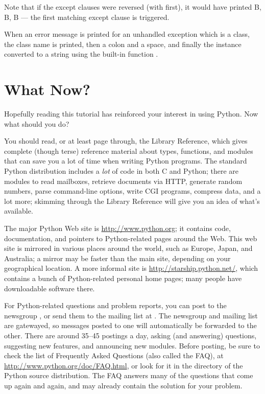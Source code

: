 \documentclass{manual}
\begin{document}
Note that if the except clauses were reversed (with
 first), it would have printed B, B, B --- the first
matching except clause is triggered.

When an error message is printed for an unhandled exception which is a
class, the class name is printed, then a colon and a space, and
finally the instance converted to a string using the built-in function
.


\chapter{What Now? \label{whatNow}}

Hopefully reading this tutorial has reinforced your interest in using
Python.  Now what should you do?

You should read, or at least page through, the Library Reference,
which gives complete (though terse) reference material about types,
functions, and modules that can save you a lot of time when writing
Python programs.  The standard Python distribution includes a
\emph{lot} of code in both C and Python; there are modules to read
\UNIX{} mailboxes, retrieve documents via HTTP, generate random
numbers, parse command-line options, write CGI programs, compress
data, and a lot more; skimming through the Library Reference will give
you an idea of what's available.

The major Python Web site is \url{http://www.python.org}; it contains
code, documentation, and pointers to Python-related pages around the
Web.  This web site is mirrored in various places around the
world, such as Europe, Japan, and Australia; a mirror may be faster
than the main site, depending on your geographical location.  A more
informal site is \url{http://starship.python.net/}, which contains a
bunch of Python-related personal home pages; many people have
downloadable software there.

For Python-related questions and problem reports, you can post to the
newsgroup , or send them to the mailing
list at .  The newsgroup and mailing list
are gatewayed, so messages posted to one will automatically be
forwarded to the other.  There are around 35--45 postings a day,
asking (and answering) questions, suggesting new features, and
announcing new modules.  Before posting, be sure to check the list of
Frequently Asked Questions (also called the FAQ), at
\url{http://www.python.org/doc/FAQ.html}, or look for it in the
 directory of the Python source distribution.  The FAQ
answers many of the questions that come up again and again, and may
already contain the solution for your problem.
\end{document}
